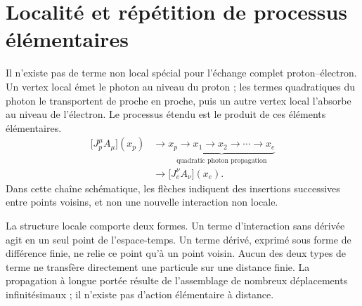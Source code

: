 \begin{classroomqa}
\end{classroomqa}

\section{Localité et répétition de processus élémentaires}

Il n’existe pas de terme non local spécial pour l’échange complet proton--électron. Un vertex local émet le photon au niveau du proton ; les termes quadratiques du photon le transportent de proche en proche, puis un autre vertex local l’absorbe au niveau de l’électron. Le processus étendu est le produit de ces éléments élémentaires.
\begin{equation}
\begin{aligned}
\bigl[J_p^\mu A_\mu\bigr](x_p)
&\longrightarrow
\underbrace{x_p\to x_1\to x_2\to\cdots\to x_e}_{\text{quadratic photon propagation}}
\\
&\longrightarrow
\bigl[J_e^\nu A_\nu\bigr](x_e).
\end{aligned}
\end{equation}
Dans cette chaîne schématique, les flèches indiquent des insertions successives entre points voisins, et non une nouvelle interaction non locale.

\begin{classroomqa}
\end{classroomqa}

La structure locale comporte deux formes. Un terme d’interaction sans dérivée agit en un seul point de l’espace-temps. Un terme dérivé, exprimé sous forme de différence finie, ne relie ce point qu’à un point voisin. Aucun des deux types de terme ne transfère directement une particule sur une distance finie. La propagation à longue portée résulte de l’assemblage de nombreux déplacements infinitésimaux ; il n’existe pas d’action élémentaire à distance.


